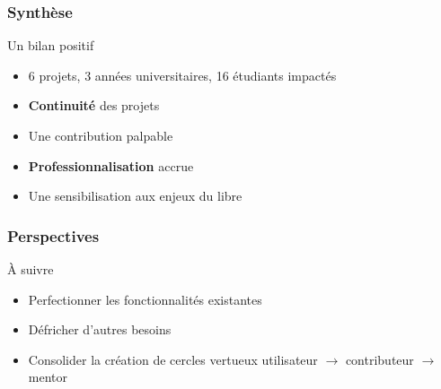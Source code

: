 \documentclass[hyperref,french,usenames,xcolor=dvipsnames]{beamer}
\begin{document}
\frame
{
  \frametitle{Synthèse}

\begin{block}{Un bilan positif}
\begin{itemize}
\item 6 projets, 3 années universitaires, 16 étudiants impactés
\item \textbf{Continuité} des projets 
\item Une contribution palpable
\item \textbf{Professionnalisation} accrue
\item Une sensibilisation aux enjeux du libre
\end{itemize}

\end{block}

}

\frame
{
  \frametitle{Perspectives}

\begin{block}{À suivre}
\begin{itemize}
\item Perfectionner les fonctionnalités existantes
\item Défricher d'autres besoins 
\item Consolider la création de cercles vertueux utilisateur $\rightarrow$ contributeur $\rightarrow$ mentor
\end{itemize}

\end{block}

}

\end{document}
